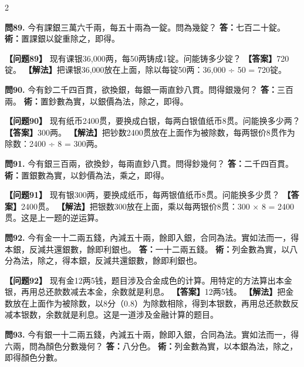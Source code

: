 \documentclass[11pt,a4paper]{article}
\begin{document}
\begin{paracol}{2}
\switchcolumn*

\textbf{問89.} 今有課銀三萬六千兩，每五十兩為一錠。問為幾錠？\break
\textbf{答：}七百二十錠。\break
\textbf{術：}置課銀以錠重除之，即得。

\switchcolumn

\textbf{【问题89】} 现有课银36,000两，每50两铸成1锭。问能铸多少锭？\break
\textbf{【答案】}720锭。\break
\textbf{【解法】}把课银36,000放在上面，除以每锭50两：36,000 ÷ 50 = 720锭。

\switchcolumn*

\textbf{問90.} 今有鈔二千四百貫，欲換銀，每銀一兩直鈔八貫。問得銀幾何？\break
\textbf{答：}三百兩。\break
\textbf{術：}置鈔數為實，以銀價為法，除之，即得。

\switchcolumn

\textbf{【问题90】} 现有纸币2400贯，要换成白银，每两白银值纸币8贯。问能换多少两？\break
\textbf{【答案】}300两。\break
\textbf{【解法】}把钞数2400贯放在上面作为被除数，每两银价8贯作为除数：2400 ÷ 8 = 300两。

\switchcolumn*

\textbf{問91.} 今有銀三百兩，欲換鈔，每兩直鈔八貫。問得鈔幾何？\break
\textbf{答：}二千四百貫。\break
\textbf{術：}置銀數為實，以鈔價為法，乘之，即得。

\switchcolumn

\textbf{【问题91】} 现有银300两，要换成纸币，每两银值纸币8贯。问能换多少贯？\break
\textbf{【答案】}2400贯。\break
\textbf{【解法】}把银数300放在上面，乘以每两银价8贯：300 × 8 = 2400贯。这是上一题的逆运算。

\switchcolumn*

\textbf{問92.} 今有金一十二兩五錢，內減五十兩，餘即入銀，合同為法。實如法而一，得本銀，反減共還銀數，餘即利銀也。\break
\textbf{答：}一十二兩五錢。\break
\textbf{術：}列金數為實，以八分為法，除之，得本銀，反減共還銀數，餘即利銀也。

\switchcolumn

\textbf{【问题92】} 现有金12两5钱，题目涉及合金成色的计算。用特定的方法算出本金银，再用总还款数减去本金，余数就是利息。\break
\textbf{【答案】}12两5钱。\break
\textbf{【解法】}把金数放在上面作为被除数，以8分（0.8）为除数相除，得到本银数，再用总还款数反减本银数，余数就是利息。这是一道涉及金融计算的题目。

\switchcolumn*

\textbf{問93.} 今有銀一十二兩五錢，內減五十兩，餘即入銀，合同為法。實如法而一，得六兩，問為顏色分數幾何？\break
\textbf{答：}八分色。\break
\textbf{術：}列金數為實，以本銀為法，除之，即得顏色分數。


\end{paracol}
\end{document}
